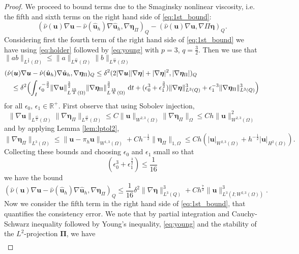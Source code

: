 \documentclass[10pt]{amsart}
\numberwithin{equation}{section}
\theoremstyle{definition}
\theoremstyle{remark}
\renewcommand{\(}{\bigl(}
\renewcommand{\)}{\bigr)}
\newcommand{\bld}[1]{\boldsymbol{#1}}
\newcommand{\bu}{\bld{u}}
\newcommand{\bhu}{\hat{\bld{u}}}
\newcommand{\bldeta}{\bld{\eta}}
\newcommand{\bPi}{\bld{\Pi}}
\begin{document}
\begin{proof}
We proceed to bound terms due to the
Smaginsky nonlinear viscosity, i.e. the fifth and sixth terms on the right
hand side of \eqref{eq:1st_bound}:
\[
(\hat \nu(\bu) \nabla \bu - \hat \nu(\bhu_h)
\nabla \bhu_h, \nabla \bldeta_\Pi)_Q - (\hat \nu(\bu) \nabla \bu, \nabla
\Pi \bldeta)_Q.
\]
Considering first the fourth term of the right hand side of
\eqref{eq:1st_bound} we have using \eqref{eq:holder} followed by
\eqref{eq:young} with $p=3$, $q=\tfrac32$. Then we use that $\|a
b\|_{L^{\frac32}(\Omega)} \leq \|a\|_{L^{\frac{15}{8}}(\Omega)} \|b\|_{L^{\frac{15}{2}}(\Omega)} $
\begin{align*}
&(\hat \nu(\bu) \nabla \bu - \hat \nu(\bhu_h)
\nabla \bhu_h, \nabla \bldeta_\Pi)_Q \leq  \delta^2 (2|\nabla
\bu| |\nabla \bldeta|+ |\nabla \bldeta|^2, |\nabla \bldeta_\Pi|)_Q 
\\
&\quad  \leq  \delta^2 \Bigl(\int_I \epsilon_0^{-\frac32} \|\nabla
\bu\|_{L^{\frac{15}{2}}(\Omega)}^{\frac32} \|\nabla
\bldeta_\Pi\|_{L^{\frac{15}{8}}(\Omega)}^{\frac32} ~\mbox{d}t 
+ (\epsilon_0^{3}+\epsilon_1^{\frac32})\|\nabla \bldeta\|_{L^3(Q)}^3 + \epsilon_1^{-3} \|\nabla
\bldeta_\Pi\|_{L^{3}(Q)}^3 \Bigr)
\end{align*}
for all $\epsilon_0,\, \epsilon_1 \in \mathbb{R}^+$. First observe
that using Sobolev injection,
\[
\|\nabla
\bu\|_{L^{\frac{15}{2}}(\Omega)} \|\nabla
\bldeta_\Pi\|_{L^{\frac{15}{8}}(\Omega)} \leq 
C \|\bu\|_{W^{2,3}(\Omega)} \|\nabla
\bldeta_\Pi\|_{\Omega} \leq C h \|\bu\|_{W^{2,3}(\Omega)}^2
\]
and by applying Lemma \ref{lem:lptol2},
\[
\|\nabla \bldeta_\Pi\|_{L^{3}(\Omega)} \leq \|\bu - \pi_h \bu\|_{W^{1,3}(\Omega)}
+ C h^{-\frac{1}{2}} \|\bldeta_{\Pi}\|_{1,\Omega} \leq C h (
|\bu|_{W^{2,3}(\Omega)} +  h^{-\frac{1}{2}} |\bu|_{H^{2}(\Omega)} ).
\]
Collecting these bounds and choosing $\epsilon_0$ and $\epsilon_1$
small so that
\[
(\epsilon_0^{3}+\epsilon_1^{\frac32}) \leq \frac{1}{16} 
\]
we have the bound
\begin{equation}
(\hat \nu(\bu) \nabla \bu - \hat \nu(\bhu_h)
\nabla \bhu_h, \nabla \bldeta_\Pi)_Q \leq \frac{1}{16} \delta^2
\|\nabla \bldeta\|_{L^3(Q)}^3 
+ C h^{\frac72} \|\bu\|^3_{L^3(I;W^{2,3}(\Omega))}.
\end{equation}
Now we consider the fifth term in the right hand side of \eqref{eq:1st_bound},
that quantifies the consistency error. We note that by partial integration and
Cauchy-Schwarz inequality followed by Young's inequality,
\eqref{eq:young}  and the stability of the $L^2$-projection $\bPi$, we have
\begin{align*}

\end{align*}
\end{proof}
\end{document}
